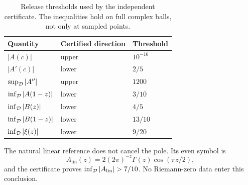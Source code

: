 \begin{table}[t]
\centering
\caption{Release thresholds used by the independent certificate. The
inequalities hold on full complex balls, not only at sampled points.}
\label{tab:bounds}
\begin{tabular}{@{}lll@{}}
\toprule
Quantity & Certified direction & Threshold \\
\midrule
$|A(c)|$ & upper & $10^{-16}$ \\
$|A'(c)|$ & lower & $2/5$ \\
$\sup_{\mathcal{D}}|A''|$ & upper & $1200$ \\
$\inf_{\mathcal{D}}|A(1-z)|$ & lower & $3/10$ \\
$\inf_{\mathcal{D}}|B(z)|$ & lower & $4/5$ \\
$\inf_{\mathcal{D}}|B(1-z)|$ & lower & $13/10$ \\
$\inf_{\mathcal{D}}|\xi(z)|$ & lower & $9/20$ \\
\bottomrule
\end{tabular}
\end{table}

The natural linear reference does not cancel the pole. Its even symbol is
\begin{equation}\label{eq:linear}
A_{\mathrm{lin}}(z)=2(2\pi)^{-z}\Gamma(z)\cos(\pi z/2),
\end{equation}
and the certificate proves $\inf_{\Disc}|A_{\mathrm{lin}}|>7/10$.
No Riemann-zero data enter this conclusion.
